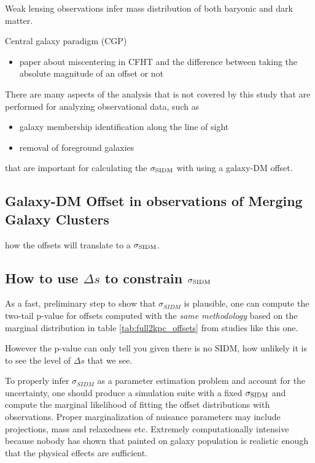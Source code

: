 Weak lensing observations infer mass distribution of both baryonic and dark matter.   

Central galaxy paradigm (CGP)
\begin{itemize}
	\item \cite{Ford2014} paper about miscentering in CFHT and the difference between
			taking the absolute magnitude of an offset or not 
	\end{itemize}


There are many aspects of the analysis that is not covered by this study that
are performed for analyzing observational data, such as 

\begin{itemize}
		\item galaxy membership identification along the line of sight
		\item removal of foreground galaxies  
	\end{itemize}
	that are important for calculating the $\sigma_{\rm SIDM}$ with using a
	galaxy-DM offset. 


\subsection{Galaxy-DM Offset in observations of Merging Galaxy Clusters}
how the offsets will translate to a $\sigma_{\rm SIDM}$.


\subsection{How to use $\Delta s$ to constrain $\sigma_{\rm SIDM}$}
As a fast, preliminary step to show that $\sigma_{SIDM}$ is plausible, one can 
compute the two-tail p-value for offsets computed with the {\it same
methodology} 
based on the marginal distribution in table
\ref{tab:full2kpc_offsets} from studies like this one. 



However the p-value can only tell you given there is no SIDM, 
how unlikely it is to see the level of $\Delta s$ that we see. 

To properly infer $\sigma_{SIDM}$ as a parameter estimation problem and 
account for the uncertainty, one should
produce a simulation suite with a fixed $\sigma_{\rm SIDM}$ and compute the
marginal likelihood of fitting the offset distributions with observations.
Proper marginalization of nuisance parameters may include 
projections, mass and relaxedness etc. 
Extremely computationally intensive because
nobody has shown that painted on galaxy population is realistic enough
that the physical effects are sufficient. 

